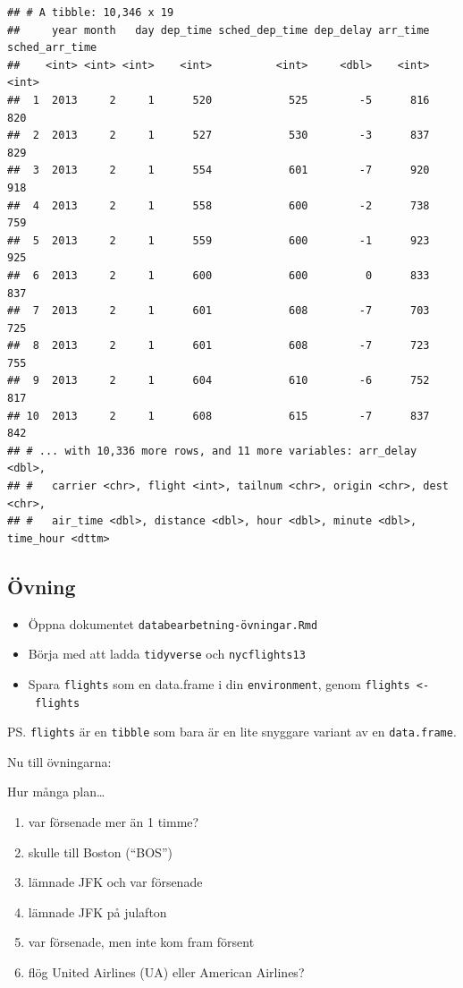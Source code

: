 \documentclass[
]{book}
\providecommand{\tightlist}{%
  \setlength{\itemsep}{0pt}\setlength{\parskip}{0pt}}
\begin{document}
\begin{verbatim}
## # A tibble: 10,346 x 19
##     year month   day dep_time sched_dep_time dep_delay arr_time sched_arr_time
##    <int> <int> <int>    <int>          <int>     <dbl>    <int>          <int>
##  1  2013     2     1      520            525        -5      816            820
##  2  2013     2     1      527            530        -3      837            829
##  3  2013     2     1      554            601        -7      920            918
##  4  2013     2     1      558            600        -2      738            759
##  5  2013     2     1      559            600        -1      923            925
##  6  2013     2     1      600            600         0      833            837
##  7  2013     2     1      601            608        -7      703            725
##  8  2013     2     1      601            608        -7      723            755
##  9  2013     2     1      604            610        -6      752            817
## 10  2013     2     1      608            615        -7      837            842
## # ... with 10,336 more rows, and 11 more variables: arr_delay <dbl>,
## #   carrier <chr>, flight <int>, tailnum <chr>, origin <chr>, dest <chr>,
## #   air_time <dbl>, distance <dbl>, hour <dbl>, minute <dbl>, time_hour <dttm>
\end{verbatim}

\hypertarget{uxf6vning}{%
\subsection{Övning}\label{uxf6vning}}

\begin{itemize}
\item
  Öppna dokumentet \texttt{databearbetning-övningar.Rmd}
\item
  Börja med att ladda \texttt{tidyverse} och \texttt{nycflights13}
\item
  Spara \texttt{flights} som en data.frame i din \texttt{environment}, genom \texttt{flights\ \textless{}-\ flights}
\end{itemize}

PS. \texttt{flights} är en \texttt{tibble} som bara är en lite snyggare variant av en \texttt{data.frame}.

Nu till övningarna:

Hur många plan\ldots{}

\begin{enumerate}
\def\labelenumi{\arabic{enumi}.}
\tightlist
\item
  var försenade mer än 1 timme?
\item
  skulle till Boston (``BOS'')
\item
  lämnade JFK och var försenade
\item
  lämnade JFK på julafton
\item
  var försenade, men inte kom fram försent
\item
  flög United Airlines (UA) eller American Airlines?
\end{enumerate}
\end{document}
